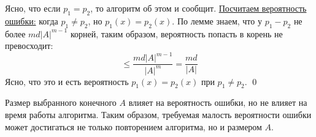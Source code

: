 Ясно, что если $p_1=p_2$, то алгоритм об этом и сообщит. \underline{Посчитаем вероятность ошибки:} когда $p_1 \neq p_2$, но $p_1(x) = p_2(x)$. По лемме знаем, что у $p_1-p_2$ не более $md|A|^{m-1}$ корней, таким образом, вероятность попасть в корень не превосходит: $$\leq \frac{md|A|^{m-1}}{|A|^m} = \frac{md}{|A|}$$ Ясно, что это и есть вероятность $p_1(x)=p_2(x)$ при $p_1 \neq p_2$. \qed

 Размер выбранного конечного $A$ влияет на вероятность ошибки, но не влияет на время работы алгоритма. Таким образом, требуемая малость вероятности ошибки может достигаться не только повторением алгоритма, но и размером $A$.
